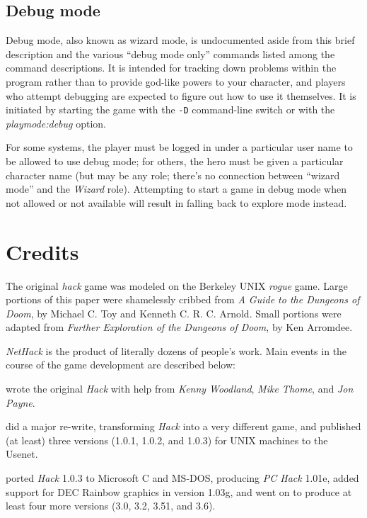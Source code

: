 \subsection*{Debug mode}

Debug mode, also known as wizard mode, is undocumented aside from this
brief description and the various ``debug mode only'' commands listed
among the command descriptions.
It is intended for tracking down problems within the
program rather than to provide god-like powers to your character, and
players who attempt debugging are expected to figure out how to use it
themselves.
It is initiated by starting the game with the
{\tt -D}
command-line switch or with the
{\it playmode:debug\/}
option.

For some systems, the player must be logged in
under a particular user name to be allowed to use debug mode; for others,
the hero must be given a particular character name (but may be any role;
there's no connection between ``wizard mode'' and the {\it Wizard\/} role).
Attempting to start a game in debug mode when not allowed
or not available will result in falling back to explore mode instead.

\section{Credits}
The original %
{\it hack\/} game was modeled on the Berkeley
UNIX
{\it rogue\/} game.  Large portions of this paper were shamelessly
cribbed from %
{\it A Guide to the Dungeons of Doom}, by Michael C. Toy
and Kenneth C. R. C. Arnold.  Small portions were adapted from
{\it Further Exploration of the Dungeons of Doom}, by Ken Arromdee.

{\it NetHack\/} is the product of literally dozens of people's work.
Main events in the course of the game development are described below:

\bigskip
{} wrote the original {\it Hack\/} with help from {\it
Kenny Woodland}, {\it Mike Thome}, and {\it Jon Payne}.

\medskip
{} did a major re-write, transforming {\it Hack\/}
into a very different game, and published (at least) three versions (1.0.1,
1.0.2, and 1.0.3) for UNIX machines to the Usenet.

\medskip
{} ported {\it Hack\/} 1.0.3 to Microsoft C and MS-DOS,
producing {\it PC Hack\/} 1.01e, added support for DEC Rainbow graphics in
version 1.03g, and went on to produce at least four more versions (3.0, 3.2,
3.51, and 3.6).

